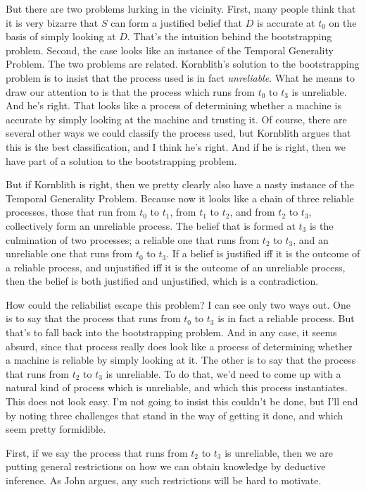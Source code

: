 \documentclass[11pt,oneside]{book}
\begin{document}
But there are two problems lurking in the vicinity. First, many people think that it is very bizarre that $S$ can form a justified belief that $D$ is accurate at $t_0$ on the basis of simply looking at $D$. That's the intuition behind the bootstrapping problem. Second, the case looks like an instance of the Temporal Generality Problem. The two problems are related. Kornblith's solution to the bootstrapping problem is to insist that the process used is in fact \textit{unreliable}. What he means to draw our attention to is that the process which runs from $t_0$ to $t_3$ is unreliable. And he's right. That looks like a process of determining whether a machine is accurate by simply looking at the machine and trusting it. Of course, there are several other ways we could classify the process used, but Kornblith argues that this is the best classification, and I think he's right. And if he is right, then we have part of a solution to the bootstrapping problem.

But if Kornblith is right, then we pretty clearly also have a nasty instance of the Temporal Generality Problem. Because now it looks like a chain of three reliable processes, those that run from $t_0$ to $t_1$, from $t_1$ to $t_2$, and from $t_2$ to $t_3$, collectively form an unreliable process. The belief that is formed at $t_3$ is the culmination of two processes; a reliable one that runs from $t_2$ to $t_3$, and an unreliable one that runs from $t_0$ to $t_3$. If a belief is justified iff it is the outcome of a reliable process, and unjustified iff it is the outcome of an unreliable process, then the belief is both justified and unjustified, which is a contradiction.

How could the reliabilist escape this problem? I can see only two ways out. One is to say that the process that runs from $t_0$ to $t_3$ is in fact a reliable process. But that's to fall back into the bootstrapping problem. And in any case, it seems absurd, since that process really does look like a process of determining whether a machine is reliable by simply looking at it. The other is to say that the process that runs from $t_2$ to $t_3$ is unreliable. To do that, we'd need to come up with a natural kind of process which is unreliable, and which this process instantiates. This does not look easy. I'm not going to insist this couldn't be done, but I'll end by noting three challenges that stand in the way of getting it done, and which seem pretty formidible.

First, if we say the process that runs from $t_2$ to $t_3$ is unreliable, then we are putting general restrictions on how we can obtain knowledge by deductive inference. As John \cite{Hawthorne2005Closure} argues, any such restrictions will be hard to motivate.
\end{document}
